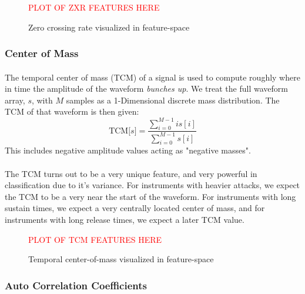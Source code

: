 \documentclass[12pt,letterpaper]{article}
\begin{document}
\begin{figure}[H]
\label{fig-FeatureZXR}
\begin{center}
\textcolor{red}{PLOT OF ZXR FEATURES HERE}
\end{center}
\caption{Zero crossing rate visualized in feature-space}
\end{figure}


\subsubsection{Center of Mass}

\paragraph*{}The temporal center of mass (TCM) of a signal is used to compute roughly where in time the amplitude of the waveform \textit{bunches up}. We treat the full waveform array, $s$, with $M$ samples as a 1-Dimensional discrete mass distribution. The TCM of that waveform is then given:
\begin{equation}
\label{eqn-FeatureTCM}
\text{TCM}\big[ s \big] = \frac{\sum_{i=0}^{M-1}i s[i]}{\sum_{i=0}^{M-1}s[i]}
\end{equation}
This includes negative amplitude values acting as "negative masses".

\paragraph*{}The TCM turns out to be a very unique feature, and very powerful in classification due to it's variance. For instruments with heavier attacks, we expect the TCM to be a very near the start of the waveform. For instruments with long sustain times, we expect a very centrally located center of mass, and for instruments with long release times, we expect a later TCM value.

\begin{figure}[H]
\label{fig-FeatureTCM}
\begin{center}
\textcolor{red}{PLOT OF TCM FEATURES HERE}
\end{center}
\caption{Temporal center-of-mass visualized in feature-space}
\end{figure}


\subsubsection{Auto Correlation Coefficients}
\end{document}
